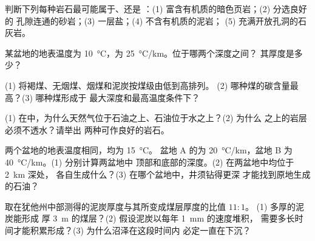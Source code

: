 \begin{exercise}[$\star$]\label{exo:g11:fossil-fuel-geology:2}
判断下列每种岩石最可能属于、还是
：(1) 富含有机质的暗色页岩；(2) 分选良好的
孔隙连通的砂岩；(3) 一层盐；(4) 不含有机质的泥岩；
(5) 充满开放孔洞的石灰岩。
\end{exercise}

\begin{exercise}[$\star$]\label{exo:g11:fossil-fuel-geology:3}
某盆地的地表温度为 \qty{10}{\degreeCelsius}，为
\qty{25}{\degreeCelsius/km}。位于哪两个深度之间？
其厚度是多少？
\end{exercise}

\begin{exercise}[$\star$]\label{exo:g11:fossil-fuel-geology:4}
(1) 将褐煤、无烟煤、烟煤和泥炭按煤级由低到高排列。
(2) 哪种煤的碳含量最高？(3) 哪种煤形成于
最大深度和最高温度条件下？
\end{exercise}

\begin{exercise}[$\star$]\label{exo:g11:fossil-fuel-geology:5}
(1) 在中，为什么天然气位于石油之上、石油位于水之上？(2) 为什么
之上的岩层必须不透水？请举出
两种可作良好的岩石。
\end{exercise}

\begin{exercise}[$\star\star$]\label{exo:g11:fossil-fuel-geology:6}
两个盆地的地表温度相同，均为 \qty{15}{\degreeCelsius}。
盆地 A 的为 \qty{20}{\degreeCelsius/km}，盆地 B 为
\qty{40}{\degreeCelsius/km}。(1) 分别计算两盆地中
顶部和底部的深度。(2) 在两盆地中均位于 \qty{2}{km} 深处，
各自生成什么？(3) 在哪个盆地中，井须钻得更深
才能找到原地生成的石油？
\end{exercise}

\begin{exercise}[$\star\star$]\label{exo:g11:fossil-fuel-geology:7}
取在犹他州中部测得的泥炭厚度与其所变成煤层厚度的比值 $11{:}1$。
(1) 多厚的泥炭能形成
厚 \qty{3}{m} 的煤层？(2) 假设泥炭以每年 \qty{1}{mm} 的速度堆积，
需要多长时间才能积累形成？(3) 为什么沼泽在这段时间内
必定一直在下沉？
\end{exercise}


